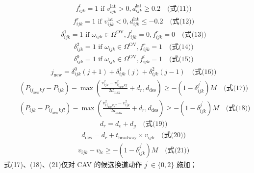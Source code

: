 \documentclass[UTF8,11pt]{ctexart}
\begin{document}
\[\begin{aligned}&\quad f^{l}_{ijk} = 1 \text{ if } v^{\text{lat}}_{ijk} > 0, d^{\text{lat}}_{ijk} \geq 0.2 \quad \text{(式(11))}\end{aligned}\]
\[\begin{aligned}&\quad f^{r}_{ijk} = 1 \text{ if } v^{\text{lat}}_{ijk} < 0, d^{\text{lat}}_{ijk} \leq -0.2 \quad \text{(式(12))}\end{aligned}\]
\[\begin{aligned}&\quad \delta^{1}_{ijk} = 1 \text{ if } \omega_{ijk} \in \Omega^{\text{OV}}, f^{l}_{ijk} = 0, f^{r}_{ijk} = 0 \quad \text{(式(13))}\end{aligned}\]
\[\begin{aligned}&\quad \delta^{2}_{ijk} = 1 \text{ if } \omega_{ijk} \in \Omega^{\text{OV}}, f^{r}_{ijk} = 1 \quad \text{(式(14))}\end{aligned}\]
\[\begin{aligned}&\quad \delta^{0}_{ijk} = 1 \text{ if } \omega_{ijk} \in \Omega^{\text{OV}}, f^{l}_{ijk} = 1 \quad \text{(式(15))}\end{aligned}\]
\[\begin{aligned}&\quad j_{\text{new}} = \delta^{0}_{ijk}(j + 1) + \delta^{1}_{ijk}(j) + \delta^{2}_{ijk}(j - 1) \quad \text{(式(16))}\end{aligned}\]
\[\begin{aligned}&\quad (P_{ij_{\text{new}}kf} - P_{ijk}) - \max \left( \frac{v^{2}_{ijk} - v^{2}_{ij_{\text{new}}kf}}{2d_{\max}} + d_{r}, d_{\text{des}} \right) \geq - (1 - \delta^{j^{\prime}}_{ijk}) M \quad \text{(式(17))}\end{aligned}\]
\[\begin{aligned}&\quad (P_{ijk} - P_{ij_{\text{new}}kfl}) - \max \left( \frac{v^{2}_{ij_{\text{new}}kfl} - v^{2}_{ijk}}{2d_{\max}} + d_{r}, d_{\text{des}} \right) \geq - (1 - \delta^{j^{\prime}}_{ijk}) M \quad \text{(式(18))}\end{aligned}\]
\[\begin{aligned}&\quad d_{r} = d_{v} + d_{g} \quad \text{(式(19))}\end{aligned}\]
\[\begin{aligned}&\quad d_{\text{des}} = d_{r} + t_{\text{headway}} \times v_{ijk} \quad \text{(式(20))}\end{aligned}\]
\[\begin{aligned}&\quad v_{ijk} - v_{lc} \geq - (1 - \delta^{j^{\prime}}_{ijk}) M \quad \text{(式(21))}\end{aligned}\]
式(17)、(18)、(21)仅对 CAV 的候选换道动作 $j^{\prime}\in\{0,2\}$ 施加；
\end{document}
